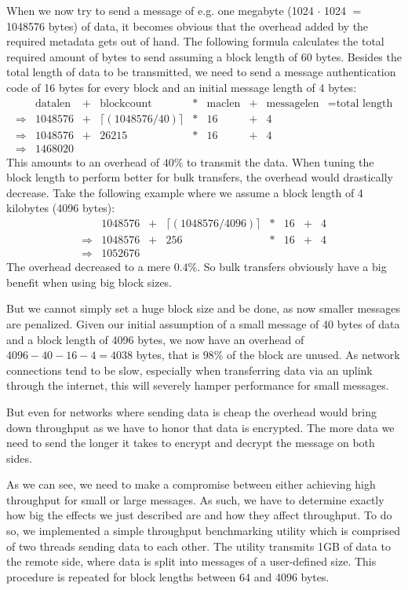 When we now try to send a message of e.g. one megabyte (1024 $\cdot$ 1024 $=$ 1048576 bytes)  of data, it becomes obvious that the overhead added by the required metadata gets out of hand.
The following formula calculates the total required amount of bytes to send assuming a block length of 60 bytes.
Besides the total length of data to be transmitted, we need to send a message authentication code of 16 bytes for every block and an initial message length of 4 bytes:
\begin{align*}
    &\text{datalen} &+ &\text{blockcount} &* &\text{maclen} &+ &\text{messagelen} &= \text{total length}\\
    \Rightarrow &1048576 &+ & \lceil(1048576 / 40)\rceil &* &16 &+ &4\\
    \Rightarrow &1048576 &+ & 26215 &* &16 &+ &4\\
    \Rightarrow &1468020
\end{align*}
This amounts to an overhead of $40\%$ to transmit the data.
When tuning the block length to perform better for bulk transfers, the overhead would drastically decrease.
Take the following example where we assume a block length of 4 kilobytes (4096 bytes):
\begin{align*}
    &1048576 &+ &\lceil(1048576 / 4096)\rceil &* &16 &+ &4\\
    \Rightarrow &1048576 &+ &256 &* &16 &+ &4\\
    \Rightarrow &1052676
\end{align*}
The overhead decreased to a mere $0.4\%$.
So bulk transfers obviously have a big benefit when using big block sizes.

But we cannot simply set a huge block size and be done, as now smaller messages are penalized.
Given our initial assumption of a small message of 40 bytes of data and a block length of 4096 bytes, we now have an overhead of $4096 - 40 - 16 - 4 = 4038$ bytes, that is $98\%$ of the block are unused.
As network connections tend to be slow, especially when transferring data via an uplink through the internet, this will severely hamper performance for small messages.

But even for networks where sending data is cheap the overhead would bring down throughput as we have to honor that data is encrypted.
The more data we need to send the longer it takes to encrypt and decrypt the message on both sides.

\medskip

As we can see, we need to make a compromise between either achieving high throughput for small or large messages.
As such, we have to determine exactly how big the effects we just described are and how they affect throughput.
To do so, we implemented a simple throughput benchmarking utility which is comprised of two threads sending data to each other.
The utility transmits 1GB of data to the remote side, where data is split into messages of a user-defined size.
This procedure is repeated for block lengths between 64 and 4096 bytes.

